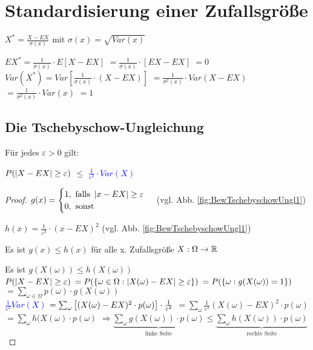 \renewcommand{\ldate}{2015-12-07}

\section{Standardisierung einer Zufallsgröße}

$X^* = \frac{X-EX}{\sigma(x)}$ mit $\sigma(x) = \sqrt{Var(x)}$

$EX^* = \frac{1}{\sigma(x)} \cdot E[X-EX]$
$=\frac{1}{\sigma(x)} \cdot [EX-EX]$
$=0$\\

$Var(X^*) = Var[\frac{1}{\sigma(x)} \cdot (X-EX)]$
$=\frac{1}{\sigma^2(x)} \cdot Var(X-EX) $
$=\frac{1}{\sigma^2(x)} \cdot Var(x) $
$=1$

\subsection{Die Tschebyschow-Ungleichung}
Für jedes $\varepsilon > 0$ gilt: 

\textcolor{red}{$ P( \left\vert X-EX \right\vert  \geq \varepsilon) $ }
$\leq$
\textcolor{blue}{$\frac{1}{\varepsilon^2} \cdot Var(X)$}

\begin{proof}
$ g(x) = 
\begin{cases}
1, \textrm{ falls }  \left\vert x-EX \right\vert  \geq \varepsilon\\
0, \textrm{ sonst}
\end{cases}$ (vgl. Abb. \ref{fig:BewTschebyschowUngl1})

$ h(x) = \frac{1}{\varepsilon^2} \cdot (x-EX)^2$ (vgl. Abb. \ref{fig:BewTschebyschowUngl1})

Es ist $g(x) \leq h(x) $ für alle x. Zufallsgröße $X: \Omega \rightarrow \mathbb{R}$

Es ist $g(X(\omega)) \leq h(X(\omega))$\\

\textcolor{red}{$ P( \left\vert X-EX \right\vert  \geq \varepsilon) $}
$=P( \left\lbrace \omega \in \Omega :  \left\vert X(\omega) - EX \right\vert  \geq \varepsilon \right\rbrace )$
$=P(  \left\lbrace \omega : g(X(\omega)) = 1 \right\rbrace  )$
$=\sum_{\omega \in \Omega} p(\omega) \cdot g(X(\omega))$\\

\textcolor{blue}{$\frac{1}{\varepsilon^2} Var(X)$}
$=\sum_{\omega}  \left[ (X(\omega) - EX)^2 \cdot p(\omega) \right]  \cdot \frac{1}{\varepsilon^2}$
$=\sum_\omega \frac{1}{\varepsilon^2} (X(\omega) - EX)^2 \cdot p(\omega)$
$=\sum_\omega h(X(\omega) \cdot p(\omega)$
$\Rightarrow \underbrace{\sum_\omega g(X(\omega)) \cdot p(\omega)}_{\textrm{linke Seite}} \leq \underbrace{\sum_\omega h(X(\omega)) \cdot p(\omega)}_{\textrm{rechte Seite}}$
\end{proof}

